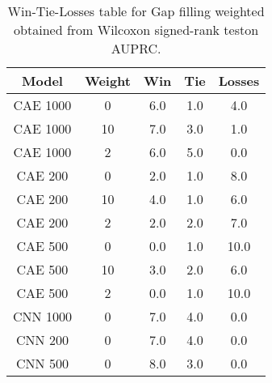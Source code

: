 \begin{table}[H]
\centering
\begin{tabular}{|c|c|c|c|c|}

\textbf{Model} & \textbf{Weight} &  \textbf{Win} &  \textbf{Tie} &  \textbf{Losses} \\
\hline

      CAE 1000 &               0 &           6.0 &           1.0 &              4.0 \\
\hline
      CAE 1000 &              10 &           7.0 &           3.0 &              1.0 \\
\hline
      CAE 1000 &               2 &           6.0 &           5.0 &              0.0 \\
\hline
       CAE 200 &               0 &           2.0 &           1.0 &              8.0 \\
\hline
       CAE 200 &              10 &           4.0 &           1.0 &              6.0 \\
\hline
       CAE 200 &               2 &           2.0 &           2.0 &              7.0 \\
\hline
       CAE 500 &               0 &           0.0 &           1.0 &             10.0 \\
\hline
       CAE 500 &              10 &           3.0 &           2.0 &              6.0 \\
\hline
       CAE 500 &               2 &           0.0 &           1.0 &             10.0 \\
\hline
      CNN 1000 &               0 &           7.0 &           4.0 &              0.0 \\
\hline
       CNN 200 &               0 &           7.0 &           4.0 &              0.0 \\
\hline
       CNN 500 &               0 &           8.0 &           3.0 &              0.0 \\
\hline

\end{tabular}
\caption{Win-Tie-Losses table for Gap filling weighted obtained from Wilcoxon signed-rank teston AUPRC.}
\label{tab:gap_filling_weighted_weighted_comparison_all}
\end{table}